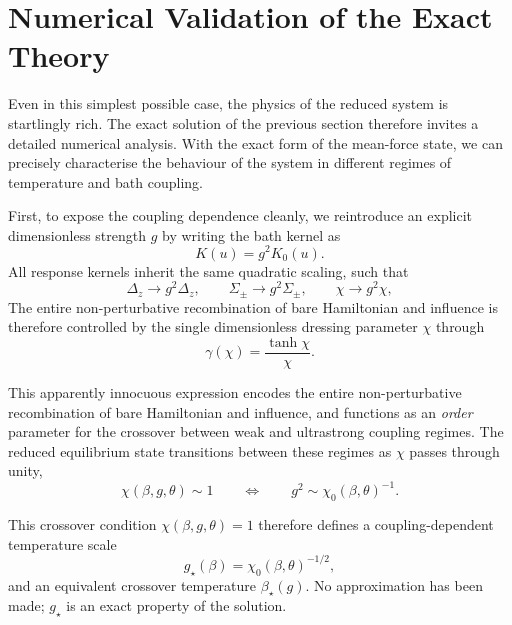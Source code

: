 \section{Numerical Validation of the Exact Theory}
\label{sec:numerical_v6}

Even in this simplest possible case, the physics of the reduced system is startlingly rich. The exact solution of the previous section therefore invites a detailed numerical analysis. With the exact form of the mean-force state, we can precisely characterise the behaviour of the system in different regimes of temperature and bath coupling. 

First, to expose the coupling dependence cleanly, we reintroduce an explicit dimensionless strength $g$ by writing the bath kernel as
\begin{equation}
    K(u)=g^2 K_0(u).
\end{equation}
All response kernels inherit the same quadratic scaling, such that
\begin{equation}
    \Delta_z \to g^2 \Delta_{z},
    \qquad
    \Sigma_\pm \to g^2 \Sigma_{\pm},
    \qquad
    \chi \to g^2 \chi,
\end{equation}
The entire non-perturbative recombination of bare Hamiltonian and influence is therefore controlled by the single dimensionless dressing parameter $\chi$ through
\begin{equation}
    \gamma(\chi)=\frac{\tanh\chi}{\chi}.
    \label{eq:gamma_chi_crossover_v5}
\end{equation}

This apparently innocuous expression encodes the entire non-perturbative recombination of bare Hamiltonian and influence, and functions as an \emph{order} parameter for the crossover between weak and ultrastrong coupling regimes. The reduced equilibrium state transitions between these regimes as $\chi$ passes through unity,
\begin{equation}
    \chi(\beta,g,\theta)\sim 1
    \qquad \Longleftrightarrow \qquad
    g^2 \sim \chi_0(\beta,\theta)^{-1}.
    \label{eq:chi_crossover_condition_v5}
\end{equation}


This crossover condition $\chi(\beta,g,\theta)=1$ therefore
defines a coupling-dependent temperature scale
\begin{equation}
  g_\star(\beta) = \chi_0(\beta,\theta)^{-1/2},
  \label{eq:gstar_def_v6}
\end{equation}
and an equivalent crossover temperature $\beta_\star(g)$.  No approximation has
been made; $g_\star$ is an exact property of the solution.


